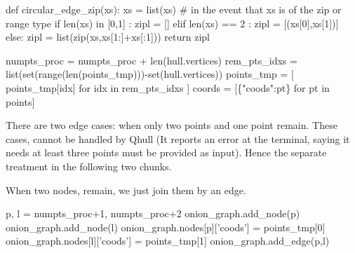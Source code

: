 \nwenddocs{}\endmoddef\nwstartdeflinemarkup{}\nwenddeflinemarkup
def circular_edge_zip(xs):
    xs = list(xs) # in the event that xs is of the zip or range type 
    if len(xs) in [0,1] :
         zipl = []
    elif len(xs) == 2 :
         zipl = [(xs[0],xs[1])]
    else:
         zipl = list(zip(xs,xs[1:]+xs[:1]))
    return zipl

\nwendcode{}\nwdocspar




\nwenddocs{}\endmoddef\nwstartdeflinemarkup{}\nwenddeflinemarkup
numpts_proc  = numpts_proc + len(hull.vertices)
rem_pts_idxs = list(set(range(len(points_tmp)))-set(hull.vertices)) 
points_tmp   = [ points_tmp[idx] for idx in rem_pts_idxs ]
coords       = [\{"coods":pt\} for pt in points]
\nwendcode{}\nwdocspar


There are two edge cases: when only two points and one point remain. These cases, cannot be handled by Qhull (It reports an error at the terminal,
saying it needs at least three points must be provided as input). Hence the separate treatment in the following two chunks. 


When two nodes, remain, we just join them by an edge. 

\nwenddocs{}\endmoddef\nwstartdeflinemarkup{}\nwenddeflinemarkup
p, l = numpts_proc+1, numpts_proc+2
onion_graph.add_node(p)
onion_graph.add_node(l)
onion_graph.nodes[p]['coods'] = points_tmp[0]
onion_graph.nodes[l]['coods'] = points_tmp[1]
onion_graph.add_edge(p,l)
\nwendcode{}\nwdocspar

